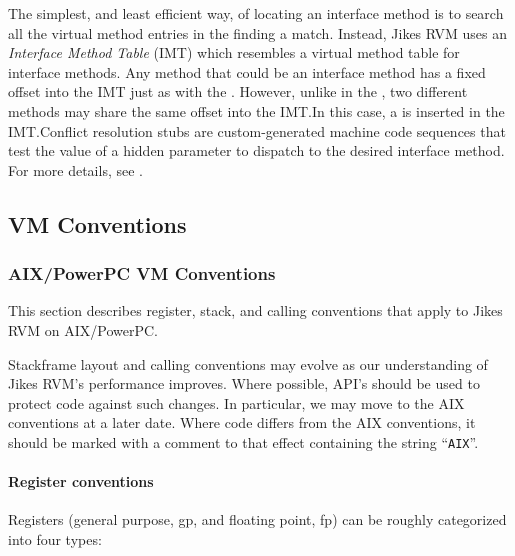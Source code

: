 %
%
The simplest, and least efficient way, of locating an interface method 
is to search all the virtual method entries in the  finding a match.
Instead, Jikes RVM uses an {\em Interface Method Table} (IMT) which resembles
a virtual method table for interface methods. Any method that could be an interface method has 
a fixed offset into the IMT just as with the . However, unlike in the , two different methods may
share the same offset into the IMT.\@ In this case, a
 is inserted in the IMT.\@ Conflict resolution stubs are
custom-generated machine code sequences that test the value of a
hidden parameter to dispatch to the desired interface method.
For more details, see
.

\subsection{VM Conventions}

\subsubsection{AIX/PowerPC VM Conventions}
\label{aix-conventions}


This section describes register, stack, and calling conventions that apply to 
Jikes RVM on AIX\-/\-Pow\-er\-PC\TMweb{}.

Stackframe layout and calling conventions may evolve as our understanding
of Jikes RVM's performance improves.  Where possible, API's should be used
to protect code against such changes.  In particular, we may move to
the AIX\TMweb{} conventions at a later date.  Where code differs from the AIX
conventions, it should be marked with a comment to that effect containing
the string ``\texttt{AIX}''.

\paragraph{Register conventions}

Registers (general purpose, gp, and floating point, fp) can be roughly
categorized into four types:

